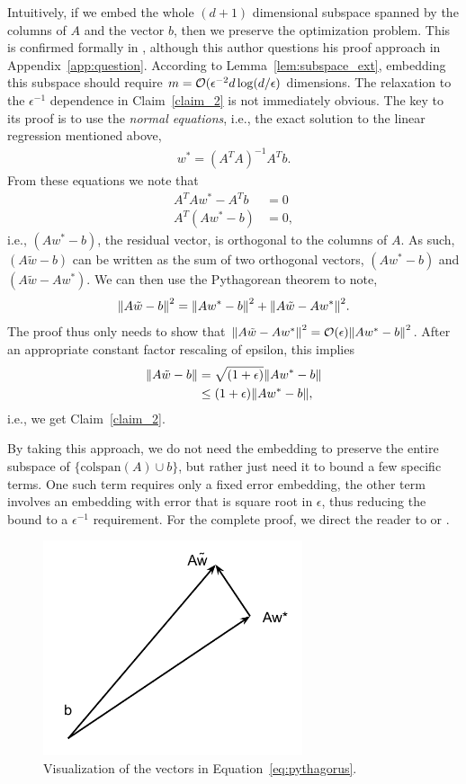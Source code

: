 Intuitively, if we embed the whole $(d+1)$ dimensional 
subspace spanned by the columns of $A$ and the vector $b$,
then we preserve the optimization problem.
This is confirmed formally in \cite[p31]{DBLP:journals/corr/Woodruff14},
although this author questions his proof approach in Appendix~\ref{app:question}.
According to Lemma~\ref{lem:subspace_ext},
embedding this subspace should require $m=\mathcal{O}(\epsilon^{-2}d\log(d/\epsilon)$ dimensions.
The relaxation to the $\epsilon^{-1}$ dependence in Claim~\ref{claim_2} is not immediately obvious. 
The key to its proof is to use the \textit{normal equations},
i.e., the exact solution to the linear regression mentioned above,
\begin{align}
\label{eq:normal_eq}
    w^* = (A^T A)^{-1}A^T b.
\end{align}
From these equations we note that
\begin{align*}
    A^T A w^* - A^T b &= 0 \\
    A^T(A w^* - b) &= 0,
\end{align*}
i.e., $(A w^* - b)$, the residual vector,
is orthogonal to the columns of $A$.
As such, $(A \tilde{w} - b)$ can be written as the sum of two orthogonal vectors,
$(A w^* - b)$ and $(A \tilde{w} - A w^*)$.
We can then use the Pythagorean theorem to note,
\begin{align}
\label{eq:pythagorus}
\norm{A \tilde{w} - b}^2 = \norm{A w^* - b}^2 + \norm{A \tilde{w} - A w^*}^2.
\end{align}
The proof thus only needs to show that $\norm{A \tilde{w} - A w^*}^2 = \calO(\epsilon)\norm{A w^* - b}^2$.
After an appropriate constant factor rescaling of epsilon, this implies
\begin{align*}
\norm{A \tilde{w} - b} &= \sqrt{(1 + \epsilon)}\norm{A w^* - b} \\
                           &\leq (1 + \epsilon)\norm{A w^* - b},
\end{align*}
i.e., we get Claim~\ref{claim_2}.

By taking this approach,
we do not need the embedding to preserve the entire subspace of $\{ \text{colspan}(A) \cup b \}$,
but rather just need it to bound a few specific terms.
One such term requires only a fixed error embedding,
the other term involves an embedding with error that is square root in $\epsilon$,
thus reducing the bound to a $\epsilon^{-1}$ requirement.
For the complete proof, 
we direct the reader to \cite{sarlos2006improved} or \cite[p33]{DBLP:journals/corr/Woodruff14}.

\begin{figure}
    \centering
    \includegraphics[width=3in]{figures/Pythogorus.pdf}
    \caption{Visualization of the vectors in Equation~\ref{eq:pythagorus}.}
    \label{fig:pythogorus}
\end{figure}